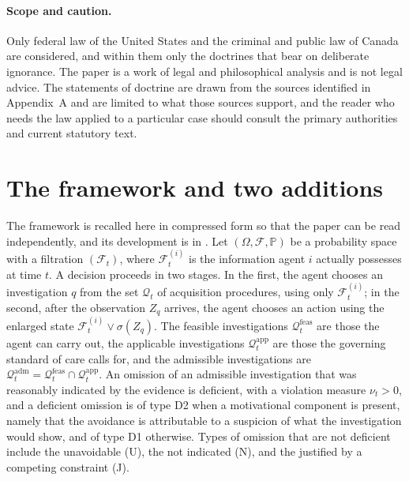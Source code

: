 \documentclass[11pt]{article}
\newcommand{\F}{\mathcal F}
\newcommand{\Q}{\mathcal Q}
\newcommand{\PP}{\mathbb P}
\newcommand{\feas}{\mathrm{feas}}
\newcommand{\adm}{\mathrm{adm}}
\newcommand{\app}{\mathrm{app}}
\theoremstyle{plain}
\theoremstyle{definition}
\begin{document}
\paragraph{Scope and caution.} Only federal law of the United States and the criminal and public law of Canada are considered, and within them only the doctrines that bear on deliberate ignorance. The paper is a work of legal and philosophical analysis and is not legal advice. The statements of doctrine are drawn from the sources identified in Appendix~A and are limited to what those sources support, and the reader who needs the law applied to a particular case should consult the primary authorities and current statutory text.

\section{The framework and two additions}

The framework is recalled here in compressed form so that the paper can be read independently, and its development is in \cite{flyxion2026domain}. Let $(\Omega,\F,\PP)$ be a probability space with a filtration $(\F_t)$, where $\F^{(i)}_t$ is the information agent $i$ actually possesses at time $t$. A decision proceeds in two stages. In the first, the agent chooses an investigation $q$ from the set $\Q_t$ of acquisition procedures, using only $\F^{(i)}_t$; in the second, after the observation $Z_q$ arrives, the agent chooses an action using the enlarged state $\F^{(i)}_t\vee\sigma(Z_q)$. The feasible investigations $\Q_t^{\feas}$ are those the agent can carry out, the applicable investigations $\Q_t^{\app}$ are those the governing standard of care calls for, and the admissible investigations are $\Q_t^{\adm}=\Q_t^{\feas}\cap\Q_t^{\app}$. An omission of an admissible investigation that was reasonably indicated by the evidence is deficient, with a violation measure $\nu_t>0$, and a deficient omission is of type D2 when a motivational component is present, namely that the avoidance is attributable to a suspicion of what the investigation would show, and of type D1 otherwise. Types of omission that are not deficient include the unavoidable (U), the not indicated (N), and the justified by a competing constraint (J).
\end{document}
